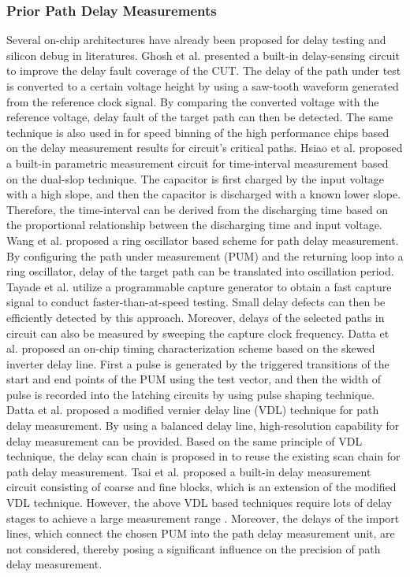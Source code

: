 \subsubsection{Prior Path Delay Measurements}
Several on-chip architectures have already been proposed for delay testing and silicon debug in literatures. Ghosh et al. \cite{ghosh2006novel} presented a built-in delay-sensing circuit to improve the delay fault coverage of the CUT. The delay of the path under test is converted to a certain voltage height by using a saw-tooth waveform generated from the reference clock signal. By comparing the converted voltage with the reference voltage, delay fault of the target path can then be detected. The same technique is also used in \cite{raychowdhury2005novel} for speed binning of the high performance chips based on the delay measurement results for circuit’s critical paths. Hsiao et al. \cite{tayade2008chip} proposed a built-in parametric measurement circuit for time-interval measurement based on the dual-slop technique. The capacitor is first charged by the input voltage with a high slope, and then the capacitor is discharged with a known lower slope. Therefore, the time-interval can be derived from the discharging time based on the proportional relationship between the discharging time and input voltage. Wang et al. \cite{wang2008path} proposed a ring oscillator based scheme for path delay measurement. By configuring the path under measurement (PUM) and the returning loop into a ring oscillator, delay of the target path can be translated into oscillation period. Tayade et al. \cite{tayade2008chip} utilize a programmable capture generator to obtain a fast capture signal to conduct faster-than-at-speed testing. Small delay defects can then be efficiently detected by this approach. Moreover, delays of the selected paths in circuit can also be measured by sweeping the capture clock frequency. Datta et al. \cite{datta2006scheme} proposed an on-chip timing characterization scheme based on the skewed inverter delay line. First a pulse is generated by the triggered transitions of the start and end points of the PUM using the test vector, and then the width of pulse is recorded into the latching circuits by using pulse shaping technique. Datta et al. \cite{datta2004chip} proposed a modified vernier delay line (VDL) technique for path delay measurement. By using a balanced delay line, high-resolution capability for delay measurement can be provided. Based on the same principle of VDL technique, the delay scan chain is proposed in \cite{datta2004delay} to reuse the existing scan chain for path delay measurement. Tsai et al. \cite{tsai2008all} proposed a built-in delay measurement circuit consisting of coarse and fine blocks, which is an extension of the modified VDL technique. However, the above VDL based techniques require lots of delay stages to achieve a large measurement range \cite{pei2009low}. Moreover, the delays of the import lines, which connect the chosen PUM into the path delay measurement unit, are not considered, thereby posing a significant influence on the precision of path delay measurement.

